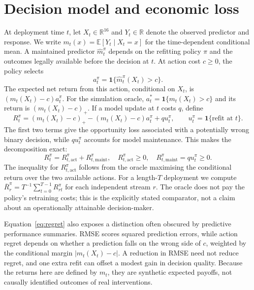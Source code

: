\documentclass[11pt,a4paper]{article}
\begin{document}
\section{Decision model and economic loss}\label{sec:econ}
At deployment time $t$, let $X_t\in\mathbb R^{16}$ and $Y_t\in\mathbb R$ denote the observed predictor and response. We write $m_t(x)=\mathbb E[Y_t\mid X_t=x]$ for the time-dependent conditional mean. A maintained predictor $\widehat m_t^{\pi}$ depends on the refitting policy $\pi$ and the outcomes legally available before the decision at $t$. At action cost $c\geq0$, the policy selects
\begin{equation}\label{eq:decision}
 a_t^{\pi}=\mathbf1\{\widehat m_t^{\pi}(X_t)>c\}.
\end{equation}
The expected net return from this action, conditional on $X_t$, is $(m_t(X_t)-c)a_t^{\pi}$. For the simulation oracle, $a_t^*=\mathbf1\{m_t(X_t)>c\}$ and its return is $(m_t(X_t)-c)_+$. If a model update at $t$ costs $q$, define
\begin{equation}\label{eq:regret}
 R_t^{\pi}=(m_t(X_t)-c)_+-(m_t(X_t)-c)a_t^{\pi}+q u_t^{\pi},\qquad u_t^{\pi}=\mathbf1\{\text{refit at }t\}.
\end{equation}
The first two terms give the opportunity loss associated with a potentially wrong binary decision, while $q u_t^{\pi}$ accounts for model maintenance. This makes the decomposition exact:
\begin{equation}\label{eq:decomposition}
 R_t^{\pi}=R_{t,\mathrm{act}}^{\pi}+R_{t,\mathrm{maint}}^{\pi},\quad R_{t,\mathrm{act}}^{\pi}\geq0,\quad R_{t,\mathrm{maint}}^{\pi}=q u_t^{\pi}\geq0.
\end{equation}
The inequality for $R_{t,\mathrm{act}}^{\pi}$ follows from the oracle maximising the conditional return over the two available actions. For a length-$T$ deployment we compute $\overline R_r^{\pi}=T^{-1}\sum_{t=0}^{T-1}R_{rt}^{\pi}$ for each independent stream $r$. The oracle does not pay the policy's retraining costs; this is the explicitly stated comparator, not a claim about an operationally attainable decision-maker.

Equation~\eqref{eq:regret} also exposes a distinction often obscured by predictive performance summaries. RMSE scores squared prediction errors, while action regret depends on whether a prediction falls on the wrong side of $c$, weighted by the conditional margin $|m_t(X_t)-c|$. A reduction in RMSE need not reduce regret, and one extra refit can offset a modest gain in decision quality. Because the returns here are defined by $m_t$, they are synthetic expected payoffs, not causally identified outcomes of real interventions.
\end{document}
